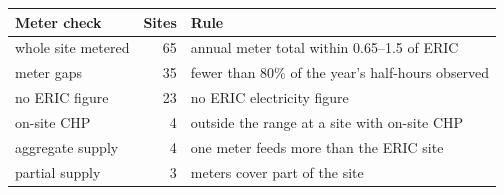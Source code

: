 \begin{tabular}{lrl}
\toprule
Meter check & Sites & Rule \\
\midrule
whole site metered & 65 & annual meter total within 0.65--1.5 of ERIC \\
meter gaps & 35 & fewer than 80\% of the year's half-hours observed \\
no ERIC figure & 23 & no ERIC electricity figure \\
on-site CHP & 4 & outside the range at a site with on-site CHP \\
aggregate supply & 4 & one meter feeds more than the ERIC site \\
partial supply & 3 & meters cover part of the site \\
\bottomrule
\end{tabular}
